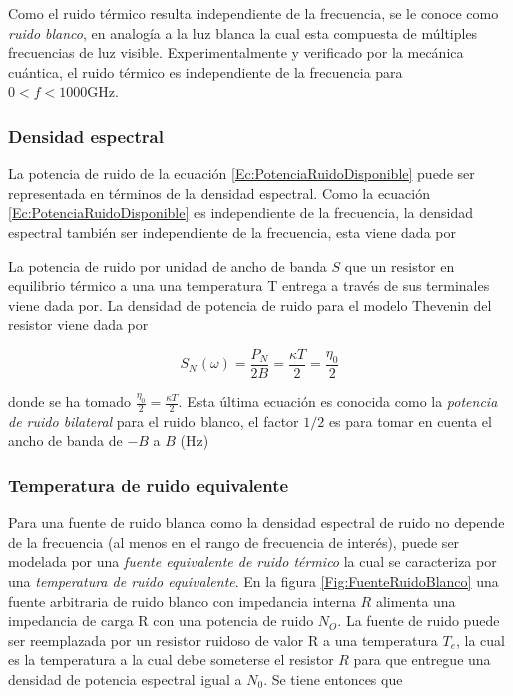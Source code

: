 \documentclass{article}
\begin{document}
		Como el ruido térmico resulta independiente de la frecuencia, se le conoce como \emph{ruido blanco}, en analogía a la luz blanca la cual esta compuesta de múltiples frecuencias de luz visible. Experimentalmente y verificado por la mecánica cuántica, el ruido térmico es independiente de la frecuencia para $0 < f < 1000\si{\giga\hertz}$.
		
	\subsubsection{Densidad espectral}
		
		La potencia de ruido de la ecuación \eqref{Ec:PotenciaRuidoDisponible} puede ser representada en términos de la densidad espectral. Como la ecuación \eqref{Ec:PotenciaRuidoDisponible} es independiente de la frecuencia, la densidad espectral también ser independiente de la frecuencia, esta viene dada por
		
		La potencia de ruido por unidad de ancho de banda $S$ que un resistor en equilibrio térmico a una una temperatura T entrega a través de sus terminales viene dada por. La densidad de potencia de ruido para el modelo Thevenin del resistor viene dada por
				
		\begin{equation}
			S_N(\omega) = \frac{P_N}{2B} = \frac{{\kappa}T}{2} = \frac{{\eta}_0}{2}
		\end{equation}	
		
		\noindent donde se ha tomado $\frac{{\eta}_0}{2} = \frac{{\kappa}T}{2}$. Esta última ecuación es conocida como la \emph{potencia de ruido bilateral} para el ruido blanco, el factor $1/2$ es para tomar en cuenta el ancho de banda de $-B$ a $B$ (\si{\Hz})
		
	\subsubsection{Temperatura de ruido equivalente}
		
		Para una fuente de ruido blanca como la densidad espectral de ruido no depende de la frecuencia (al menos en el rango de frecuencia de interés), puede ser modelada por una \emph{fuente equivalente de ruido térmico} la cual se caracteriza por una \emph{temperatura de ruido equivalente}. En la figura \ref{Fig:FuenteRuidoBlanco} una fuente arbitraria de ruido blanco con impedancia interna $R$ alimenta una impedancia de carga R con una potencia de ruido $N_O$. La fuente de ruido puede ser reemplazada por un resistor ruidoso de valor R a una temperatura $T_e$, la cual es la temperatura a la cual debe someterse el resistor $R$ para que entregue una densidad de potencia espectral igual a $N_0$. Se tiene entonces que 
		
\end{document}
